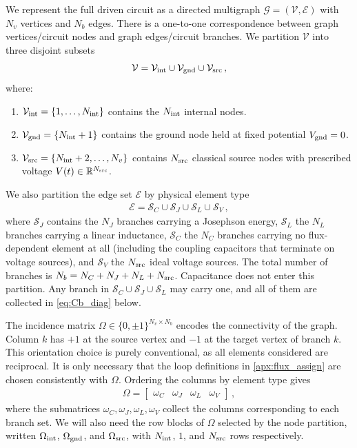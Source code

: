 \documentclass[10pt,aps,pra,onecolumn,superscriptaddress,floatfix,nofootinbib]{revtex4-2}
\begin{document}
We represent the full driven circuit as a directed multigraph $\mathcal{G} = (\mathcal{V}, \mathcal{E})$ with $N_v$ vertices and $N_b$ edges.
There is a one-to-one correspondence between graph vertices/circuit nodes and graph edges/circuit branches.
We partition $\mathcal{V}$ into three disjoint subsets
\begin{align}
    \mathcal{V} = \mathcal{V}_{\rm int} \cup \mathcal{V}_{\rm gnd} \cup \mathcal{V}_{\rm src} \, ,
\end{align}
where:
\begin{enumerate}
    \item $\mathcal{V}_{\rm int} = \{1, \dots, N_{\rm int}\}$ contains the $N_{\rm int}$ internal nodes.
    \item $\mathcal{V}_{\rm gnd} = \{N_{\rm int} + 1\}$ contains the ground node held at fixed potential $V_{\rm gnd} = 0$.
    \item $\mathcal{V}_{\rm src} = \{N_{\rm int} + 2, \dots, N_v\}$ contains $N_{\rm src}$ classical source nodes with prescribed voltage $V(t) \in \mathbb{R}^{N_{\rm src}}$.
\end{enumerate}
We also partition the edge set $\mathcal{E}$ by physical element type
\begin{align}
    \mathcal{E} = \mathcal{S}_C \cup \mathcal{S}_J \cup \mathcal{S}_L \cup \mathcal{S}_V \, ,
\end{align}
where $\mathcal{S}_J$ contains the $N_J$ branches carrying a Josephson energy, $\mathcal{S}_L$ the $N_L$ branches carrying a linear inductance, $\mathcal{S}_C$ the $N_C$ branches carrying no flux-dependent element at all (including the coupling capacitors that terminate on voltage sources), and $\mathcal{S}_V$ the $N_{\rm src}$ ideal voltage sources.
The total number of branches is $N_b = N_C + N_J + N_L + N_{\rm src}$.
Capacitance does not enter this partition.
Any branch in $\mathcal{S}_C \cup \mathcal{S}_J \cup \mathcal{S}_L$ may carry one, and all of them are collected in \cref{eq:Cb_diag} below.

The incidence matrix $\Omega \in \{0,\pm 1\}^{N_v \times N_b}$ encodes the connectivity of the graph.
Column $k$ has $+1$ at the source vertex and $-1$ at the target vertex of branch $k$.
This orientation choice is purely conventional, as all elements considered are reciprocal.
It is only necessary that the loop definitions in \cref{apx:flux_assign} are chosen consistently with $\Omega$.
Ordering the columns by element type gives
\begin{align}
    \Omega = \begin{bmatrix} \omega_C & \omega_J & \omega_L & \omega_V \end{bmatrix} \, ,
    \label{eq:Omega_columns}
\end{align}
where the submatrices $\omega_C, \omega_J, \omega_L, \omega_V$ collect the columns corresponding to each branch set.
We will also need the row blocks of $\Omega$ selected by the node partition, written $\Omega_{\rm int}$, $\Omega_{\rm gnd}$, and $\Omega_{\rm src}$, with $N_{\rm int}$, $1$, and $N_{\rm src}$ rows respectively.
\end{document}

